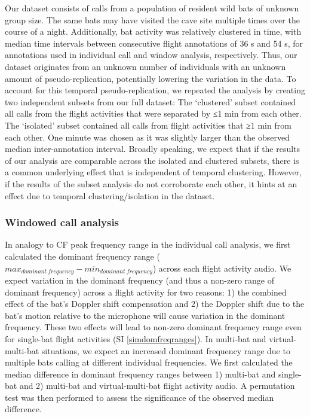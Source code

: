 \documentclass[
]{book}
\begin{document}
Our dataset consists of calls from a population of resident wild bats of unknown group size. The same bats may have visited the cave site multiple times over the course of a night. Additionally, bat activity was relatively clustered in time, with median time intervals between consecutive flight annotations of 36 s and 54 s, for annotations used in individual call and window analysis, respectively. Thus, our dataset originates from an unknown number of individuals with an unknown amount of pseudo-replication, potentially lowering the variation in the data. To account for this temporal pseudo-replication, we repeated the analysis by creating two independent subsets from our full dataset: The `clustered' subset contained all calls from the flight activities that were separated by ≤1 min from each other. The `isolated' subset contained all calls from flight activities that ≥1 min from each other. One minute was chosen as it was slightly larger than the observed median inter-annotation interval. Broadly speaking, we expect that if the results of our analysis are comparable across the isolated and clustered subsets, there is a common underlying effect that is independent of temporal clustering. However, if the results of the subset analysis do not corroborate each other, it hints at an effect due to temporal clustering/isolation in the dataset.

\hypertarget{windowed-call-analysis}{%
\subsubsection{Windowed call analysis}\label{windowed-call-analysis}}

In analogy to CF peak frequency range in the individual call analysis, we first calculated the dominant frequency range (\(max_{dominant \: frequency}-min_{dominant \:frequency}\)) across each flight activity audio. We expect variation in the dominant frequency (and thus a non-zero range of dominant frequency) across a flight activity for two reasons: 1) the combined effect of the bat's Doppler shift compensation and 2) the Doppler shift due to the bat's motion relative to the microphone will cause variation in the dominant frequency. These two effects will lead to non-zero dominant frequency range even for single-bat flight activities (SI \ref{simdomfreqranges}). In multi-bat and virtual-multi-bat situations, we expect an increased dominant frequency range due to multiple bats calling at different individual frequencies. We first calculated the median difference in dominant frequency ranges between 1) multi-bat and single-bat and 2) multi-bat and virtual-multi-bat flight activity audio. A permutation test was then performed to assess the significance of the observed median difference.
\end{document}
